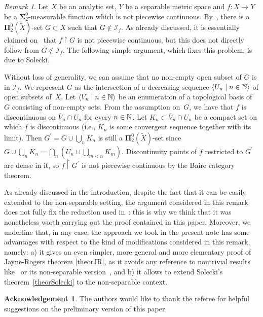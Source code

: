 \documentclass{raex}
\newcommand{\N}{\NaturalNumbers}
\theoremstyle{plain}
\theoremstyle{definition}
\newtheorem*{ack}{Acknowledgement}
\theoremstyle{remark}
\newtheorem*{rem*}{Remark}
\def\S{\mathbf{\Sigma}}
\def\P{\mathbf{\Pi}}
\def\I{\mathcal{I}}
\begin{document}
\begin{rem*}

Let $X$ be an analytic set, $Y$ be a separable metric space and $f \colon X \to Y$ be a $\S^0_2$-measurable function which is not piecewise continuous. By~\cite[Theorem~1]{sol2}, there is a $\P^0_2(\widetilde{X})$-set $G\subset X$ such that $G \notin \I_f$. As already discussed, it is essentially  claimed on~\cite[p.~530]{sol} that $f \restriction G$ is not piecewise continuous, but this does not directly follow from $G \notin \I_f$. The following simple argument, which fixes this problem, is due to Solecki.


Without loss of generality, we can assume that no non-empty open subset of $G$ is in $\I_f$. We represent $G$ as the intersection of a decreasing sequence $\langle U_n \mid n \in \N \rangle$ of open subsets of~$\widetilde{X}$. Let $\langle V_n \mid n \in \N \rangle$ be an enumeration of a topological basis of $G$ consisting of non-empty sets. From the assumption on~$G$, we have that $f$ is discontinuous on 
$\overline{V}_n\cap U_n$ for every $n \in \N$. Let  $K_n\subset \overline{V}_n\cap U_n$ be a compact set on which $f$ is discontinuous (i.e., $K_n$ is some convergent sequence together with its limit). Then 
$G^\prime  = G\cup \bigcup_n K_n$  
is still a $\P^0_2(\widetilde{X})$-set since 
$G\cup \bigcup_n K_n  = \bigcap_n (U_n\cup \bigcup_{m<n} K_m)$.
Discontinuity points of $f$ restricted to $G^\prime$ are dense in it, so $f \restriction G^\prime$ is not piecewise continuous by the Baire category theorem. 


As already discussed in the introduction, despite the fact that it can be easily extended to the non-separable setting, the argument considered in this remark does not fully fix the reduction used in~\cite[Proof of Theorem 1.1]{mot-sem}: this is why we think that it was nonetheless worth carrying out the proof contained in this paper. Moreover, we underline that, in any case, the approach we took in the present note has some advantages with respect to the kind of modifications considered in this remark, namely: a) it gives an even simpler, more general and more elementary proof of Jayne-Rogers theorem \ref{theorJR}, as it avoids any reference to nontrivial results like~\cite[Theorem~1]{sol2} or its non-separable version~\cite[Theorem 1.3]{holzajzel}, and b) it allows to extend Solecki's theorem~\ref{theorSolecki} to the non-separable context.
\end{rem*}

\begin{ack}
The authors would like to thank the referee for helpful suggestions on the preliminary version of this paper.
\end{ack}
\end{document}
